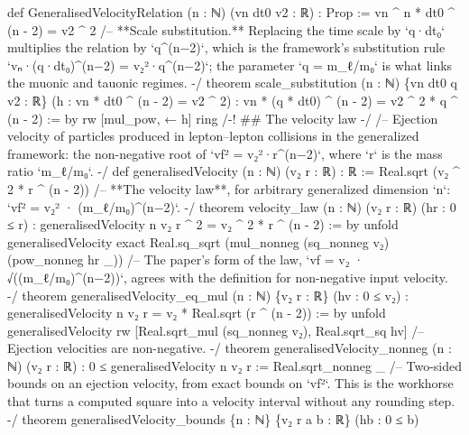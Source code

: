 \documentclass[11pt,a4paper]{article}
\begin{document}
{def GeneralisedVelocityRelation (n : ℕ) (vn dt0 v2 : ℝ) : Prop :=
  vn \textasciicircum{} n * dt0 \textasciicircum{} (n - 2) = v2 \textasciicircum{} 2
\mbox{}
/-- **Scale substitution.**  Replacing the time scale by `q·dt₀` multiplies the
relation by `q\textasciicircum{}(n−2)`, which is the framework's substitution rule
`vₙ·(q·dt₀)\textasciicircum{}(n−2) = v₂²·q\textasciicircum{}(n−2)`; the parameter `q = m\_\allowbreak{}ℓ/m₀` is what links the
muonic and tauonic regimes. -/
theorem scale\_\allowbreak{}substitution (n : ℕ) \{vn dt0 q v2 : ℝ\}
    (h : vn * dt0 \textasciicircum{} (n - 2) = v2 \textasciicircum{} 2) :
    vn * (q * dt0) \textasciicircum{} (n - 2) = v2 \textasciicircum{} 2 * q \textasciicircum{} (n - 2) := by
  rw [mul\_\allowbreak{}pow, ← h]
  ring
\mbox{}
/-! \#\# The velocity law -/
\mbox{}
/-- Ejection velocity of particles produced in lepton–lepton collisions in the
generalized framework: the non-negative root of `vf² = v₂²·r\textasciicircum{}(n−2)`, where `r`
is the mass ratio `m\_\allowbreak{}ℓ/m₀`. -/
def generalisedVelocity (n : ℕ) (v₂ r : ℝ) : ℝ := Real.sqrt (v₂ \textasciicircum{} 2 * r \textasciicircum{} (n - 2))
\mbox{}
/-- **The velocity law**, for arbitrary generalized dimension `n`:
`vf² = v₂² · (m\_\allowbreak{}ℓ/m₀)\textasciicircum{}(n−2)`. -/
theorem velocity\_\allowbreak{}law (n : ℕ) (v₂ r : ℝ) (hr : 0 ≤ r) :
    generalisedVelocity n v₂ r \textasciicircum{} 2 = v₂ \textasciicircum{} 2 * r \textasciicircum{} (n - 2) := by
  unfold generalisedVelocity
  exact Real.sq\_\allowbreak{}sqrt (mul\_\allowbreak{}nonneg (sq\_\allowbreak{}nonneg v₂) (pow\_\allowbreak{}nonneg hr \_\allowbreak{}))
\mbox{}
/-- The paper's form of the law, `vf = v₂ · √((m\_\allowbreak{}ℓ/m₀)\textasciicircum{}(n−2))`, agrees with the
definition for non-negative input velocity. -/
theorem generalisedVelocity\_\allowbreak{}eq\_\allowbreak{}mul (n : ℕ) \{v₂ r : ℝ\} (hv : 0 ≤ v₂) :
    generalisedVelocity n v₂ r = v₂ * Real.sqrt (r \textasciicircum{} (n - 2)) := by
  unfold generalisedVelocity
  rw [Real.sqrt\_\allowbreak{}mul (sq\_\allowbreak{}nonneg v₂), Real.sqrt\_\allowbreak{}sq hv]
\mbox{}
/-- Ejection velocities are non-negative. -/
theorem generalisedVelocity\_\allowbreak{}nonneg (n : ℕ) (v₂ r : ℝ) : 0 ≤ generalisedVelocity n v₂ r :=
  Real.sqrt\_\allowbreak{}nonneg \_\allowbreak{}
\mbox{}
/-- Two-sided bounds on an ejection velocity, from exact bounds on `vf²`.
This is the workhorse that turns a computed square into a velocity interval
without any rounding step. -/
theorem generalisedVelocity\_\allowbreak{}bounds \{n : ℕ\} \{v₂ r a b : ℝ\} (hb : 0 ≤ b)
}
\end{document}
